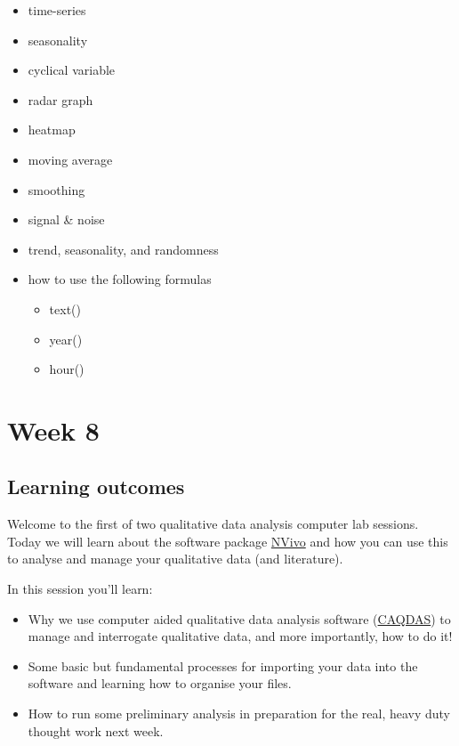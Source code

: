 \documentclass[
]{book}
\providecommand{\tightlist}{%
  \setlength{\itemsep}{0pt}\setlength{\parskip}{0pt}}
\begin{document}
\begin{itemize}
\tightlist
\item
  time-series
\item
  seasonality
\item
  cyclical variable
\item
  radar graph
\item
  heatmap
\item
  moving average
\item
  smoothing
\item
  signal \& noise
\item
  trend, seasonality, and randomness
\item
  how to use the following formulas

  \begin{itemize}
  \tightlist
  \item
    text()
  \item
    year()
  \item
    hour()
  \end{itemize}
\end{itemize}

\hypertarget{week8}{%
\chapter{Week 8}\label{week8}}

\hypertarget{learning-outcomes-7}{%
\section{Learning outcomes}\label{learning-outcomes-7}}

Welcome to the first of two qualitative data analysis computer lab sessions. Today we will learn about the software package \href{https://www.qsrinternational.com/nvivo-qualitative-data-analysis-software/home}{NVivo} and how you can use this to analyse and manage your qualitative data (and literature).

In this session you'll learn:

\begin{itemize}
\tightlist
\item
  Why we use computer aided qualitative data analysis software (\href{https://en.wikipedia.org/wiki/Computer-assisted_qualitative_data_analysis_software}{CAQDAS}) to manage and interrogate qualitative data, and more importantly, how to do it!
\item
  Some basic but fundamental processes for importing your data into the software and learning how to organise your files.
\item
  How to run some preliminary analysis in preparation for the real, heavy duty thought work next week.
\end{itemize}
\end{document}
